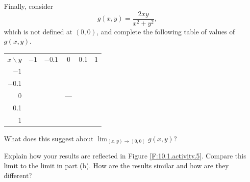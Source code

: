 \begin{pa}
\item Finally,
  consider
  $$
  g(x,y) = \frac{2xy}{x^2+y^2},
  $$
  which is not defined at $(0,0)$, and complete the following table of values of $g(x,y)$.

  \begin{center}
    \begin{tabular}{|r||c|c|c|c|c|}
      \hline
      $x\backslash y$ &$-1$ &$-0.1$ & 0 & 0.1 & 1 \\
      \hhline{|=|=|=|=|=|=|}
	 $-1$  & \hspace*{0.5in} & \hspace*{0.5in} & \hspace*{0.5in} & \hspace*{0.5in} & \hspace*{0.5in} \\
      \hline
      $-0.1$ & & & & & \\
      \hline
      0  &  &  & --- & & \\
      \hline
       0.1 & & & & & \\
      \hline
      1  & &  & & &  \\
      \hline
    \end{tabular}
  \end{center}
  What does this suggest about $\lim_{(x,y)\to(0,0)} g(x,y)$?

\item Explain how your results are reflected in Figure
  \ref{F:10.1.activity.5}. Compare this limit to the limit in part (b). How are the results similar and how are they different?


\end{pa}
